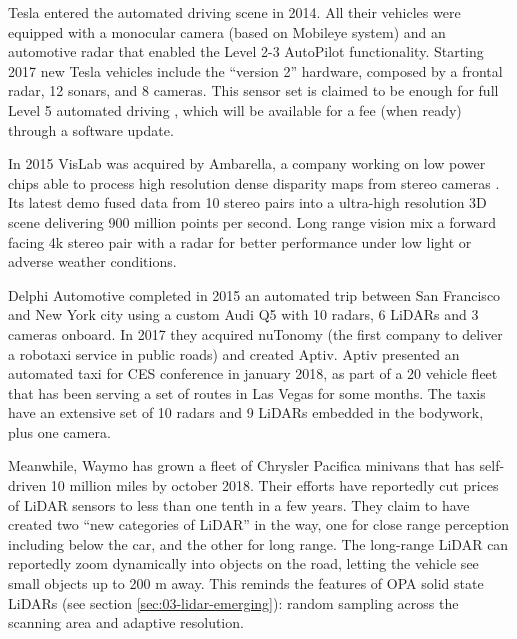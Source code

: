 Tesla entered the automated driving scene in 2014.
All their vehicles were equipped with a monocular camera (based on 
Mobileye system) and an automotive radar that enabled the Level 2-3 AutoPilot
functionality. 
Starting 2017 new Tesla vehicles include the ``version 2'' hardware, 
composed by a frontal radar, 12 sonars, and 8 cameras.
This sensor set is claimed to be enough for full Level 5 automated driving
\cite{Hawkins2017}, which will be available for a fee (when ready) through a
software update.

In 2015 VisLab was acquired by Ambarella, a company working on low power chips
able to process high resolution dense disparity maps from stereo cameras
\cite{Ambarella2018}. 
Its latest demo \cite{AUVSI2018} fused data from 10 stereo pairs into a
ultra-high resolution 3D scene delivering 900 million points per second.
Long range vision mix a forward facing 4k stereo pair with a radar for better
performance under low light or adverse weather conditions. 

Delphi Automotive completed in 2015 an automated trip between San Francisco and
New York city using a custom Audi Q5 with 10 radars, 6 LiDARs and 3 cameras 
onboard. In 2017 they acquired nuTonomy (the first company to deliver a 
robotaxi service in public roads) and created Aptiv. 
Aptiv presented an automated taxi for CES conference in january 2018, as part
of a 20 vehicle fleet that has been serving a set of routes in Las Vegas for
some months. The taxis have an extensive set of 10 radars and 9 LiDARs embedded 
in the bodywork, plus one camera.

Meanwhile, Waymo has grown a fleet of Chrysler Pacifica minivans that has
self-driven 10 million miles by october 2018. Their efforts have reportedly 
cut prices of LiDAR sensors to less than one tenth in a few years. 
They claim to have created two ``new categories of LiDAR'' \cite{Waymoteam2017} 
in the way, one for close range perception including below the car, and the
other for long range. The long-range LiDAR can reportedly zoom dynamically into 
objects on the road, letting the vehicle see small objects up to 200 m away. 
This reminds the features of OPA solid state LiDARs (see section
\ref{sec:03-lidar-emerging}): random sampling across the 
scanning area and adaptive resolution.

